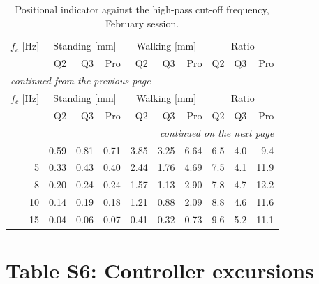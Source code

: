 \documentclass[11pt,a4paper]{article}
\begin{document}
\begin{longtable}{rrrrrrrrrr}
\caption{Positional indicator against the high-pass cut-off frequency, February session.}\label{tab:S5}\\
\toprule
$f_c$ [Hz] & \multicolumn{3}{c}{Standing [mm]} & \multicolumn{3}{c}{Walking [mm]} & \multicolumn{3}{c}{Ratio} \\
& Q2 & Q3 & Pro & Q2 & Q3 & Pro & Q2 & Q3 & Pro \\
\midrule
\endfirsthead
\multicolumn{10}{l}{\footnotesize\itshape continued from the previous page}\\
\toprule
$f_c$ [Hz] & \multicolumn{3}{c}{Standing [mm]} & \multicolumn{3}{c}{Walking [mm]} & \multicolumn{3}{c}{Ratio} \\
& Q2 & Q3 & Pro & Q2 & Q3 & Pro & Q2 & Q3 & Pro \\
\midrule
\endhead
\midrule
\multicolumn{10}{r}{\footnotesize\itshape continued on the next page}\\
\endfoot
\bottomrule
\endlastfoot
3 & 0.59 & 0.81 & 0.71 & 3.85 & 3.25 & 6.64 & 6.5 & 4.0 & 9.4 \\
5 & 0.33 & 0.43 & 0.40 & 2.44 & 1.76 & 4.69 & 7.5 & 4.1 & 11.9 \\
8 & 0.20 & 0.24 & 0.24 & 1.57 & 1.13 & 2.90 & 7.8 & 4.7 & 12.2 \\
10 & 0.14 & 0.19 & 0.18 & 1.21 & 0.88 & 2.09 & 8.8 & 4.6 & 11.6 \\
15 & 0.04 & 0.06 & 0.07 & 0.41 & 0.32 & 0.73 & 9.6 & 5.2 & 11.1 \\
\end{longtable}

\section*{Table S6: Controller excursions}
\end{document}
